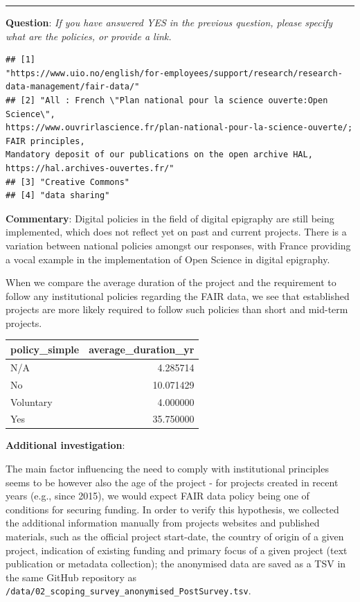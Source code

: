 \documentclass[
  10pt,
]{article}
\begin{document}
\begin{center}\rule{0.5\linewidth}{0.5pt}\end{center}

\textbf{Question}: \emph{If you have answered YES in the previous
question, please specify what are the policies, or provide a link.}

\begin{verbatim}
## [1]
"https://www.uio.no/english/for-employees/support/research/research-data-management/fair-data/"
## [2] "All : French \"Plan national pour la science ouverte:Open Science\",
https://www.ouvrirlascience.fr/plan-national-pour-la-science-ouverte/; FAIR principles,
Mandatory deposit of our publications on the open archive HAL,
https://hal.archives-ouvertes.fr/"
## [3] "Creative Commons"
## [4] "data sharing"
\end{verbatim}

\textbf{Commentary}: Digital policies in the field of digital epigraphy
are still being implemented, which does not reflect yet on past and
current projects. There is a variation between national policies amongst
our responses, with France providing a vocal example in the
implementation of Open Science in digital epigraphy.

When we compare the average duration of the project and the requirement
to follow any institutional policies regarding the FAIR data, we see
that established projects are more likely required to follow such
policies than short and mid-term projects.

\begin{longtable}[]{@{}lr@{}}
\toprule
policy\_simple & average\_duration\_yr \\
\midrule
\endhead
N/A & 4.285714 \\
No & 10.071429 \\
Voluntary & 4.000000 \\
Yes & 35.750000 \\
\bottomrule
\end{longtable}

\textbf{Additional investigation}:

The main factor influencing the need to comply with institutional
principles seems to be however also the age of the project - for
projects created in recent years (e.g., since 2015), we would expect
FAIR data policy being one of conditions for securing funding. In order
to verify this hypothesis, we collected the additional information
manually from projects websites and published materials, such as the
official project start-date, the country of origin of a given project,
indication of existing funding and primary focus of a given project
(text publication or metadata collection); the anonymised data are saved
as a TSV in the same GitHub repository as
\texttt{/data/02\_scoping\_survey\_anonymised\_PostSurvey.tsv}.
\end{document}
